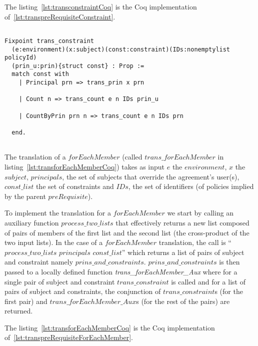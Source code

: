 The listing~\ref{lst:transconstraintCoq} is the Coq implementation of~\ref{lst:transpreRequisiteConstraint}.


\begin{lstlisting}

Fixpoint trans_constraint 
  (e:environment)(x:subject)(const:constraint)(IDs:nonemptylist policyId)
  (prin_u:prin){struct const} : Prop := 
  match const with
    | Principal prn => trans_prin x prn
  
    | Count n => trans_count e n IDs prin_u 

    | CountByPrin prn n => trans_count e n IDs prn 

  end.
  
\end{lstlisting}

The translation of a $forEachMember$ (called $trans\_forEachMember$ in listing~\ref{lst:transforEachMemberCoq}) takes as input $e$ the $environment$, $x$ the $subject$, $principals$, the set of subjects that override the agreement's user(s), $const\_list$ the set of constraints and $IDs$, the set of identifiers (of policies implied by the parent $preRequisite$).

To implement the translation for a $forEachMember$ we start by calling an auxiliary function $process\_two\_lists$ that effectively returns a new list composed of pairs of members of the first list and the second list (the cross-product of the two input lists). In the case of a $forEachMember$ translation, the call is ``$process\_two\_lists$ $principals$ $const\_list$'' which returns a list of pairs of subject and constraint namely $prins\_and\_constraints$. $prins\_and\_constraints$ is then passed to a locally defined function \emph{ trans_forEachMember_Aux} where for a single pair of subject and constraint $trans\_constraint$ is called and for a list of pairs of subject and constraints, the conjunction of $trans\_constraint$s (for the first pair) and $trans\_forEachMember\_Aux$s (for the rest of the pairs) are returned.

The listing~\ref{lst:transforEachMemberCoq} is the Coq implementation of~\ref{lst:transpreRequisiteForEachMember}.

